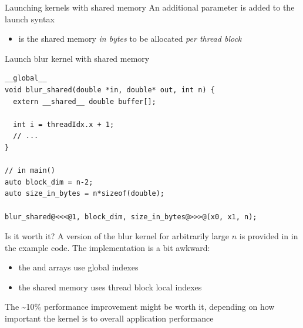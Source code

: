 \begin{frame}[fragile]{}
    \begin{info}{Launching kernels with shared memory}
        An additional parameter is added to the launch syntax\\
        \centering {}
        \begin{itemize}
            \item {} is the shared memory \emph{in bytes} to be allocated \emph{per thread block}
        \end{itemize}
    \end{info}

    \begin{code}{Launch blur kernel with shared memory}
        \begin{lstlisting}[style=boxcudatiny]
__global__
void blur_shared(double *in, double* out, int n) {
  extern __shared__ double buffer[];

  int i = threadIdx.x + 1;
  // ...
}

// in main()
auto block_dim = n-2;
auto size_in_bytes = n*sizeof(double);

blur_shared@<<<@1, block_dim, size_in_bytes@>>>@(x0, x1, n);
        \end{lstlisting}
    \end{code}

\end{frame}

\begin{frame}[fragile]{}
    \begin{info}{Is it worth it?}
        A version of the blur kernel for arbitrarily large $n$ is provided in  in the example code. The implementation is a bit awkward:
        \begin{itemize}
            \item  the  and  arrays use global indexes
            \item  the shared memory uses thread block local indexes
        \end{itemize}
        The \textasciitilde10\% performance improvement might be worth it, depending on how important the kernel is to overall application performance
    \end{info}

\end{frame}


